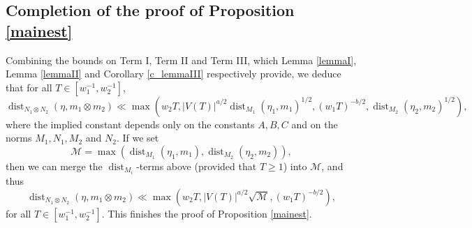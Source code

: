 \documentclass[11pt,reqno,a4paper]{amsart}
\numberwithin{equation}{section}
\DeclareMathOperator{\dist}{dist}
\theoremstyle{theorem}
\theoremstyle{definition}
\begin{document}
\subsection{Completion of the proof of Proposition \ref{mainest}}

Combining the bounds on 
Term I, Term II and Term III, which Lemma \ref{lemmaI}, Lemma \ref{lemmaII} and Corollary \ref{c_lemmaIII} 
respectively provide, we deduce that for all $T\in [w_1^{-1},w_2^{-1}]$,
\[
\dist_{N_1 \otimes N_2}(\eta,m_1 \otimes m_2)
\ll
\max(w_2 T, |V(T)|^{a/2} \dist_{M_1}(\eta_1,m_1)^{1/2},(w_1 T)^{-b/2},\dist_{M_2}(\eta_2,m_2)^{1/2}),
\]
where the implied constant depends only on the constants $A, B, C$ and on the norms $M_1,N_1,M_2$ and $N_2$. If we set
\[
\mathcal{M} = \max(\dist_{M_1}(\eta_1,m_1),\dist_{M_2}(\eta_2,m_2)),
\]
then we can merge the $\dist_{M_i}$-terms above (provided that $T \geq 1$) into $\mathcal{M}$, and thus
\[
\dist_{N_1 \otimes N_2}(\eta,m_1 \otimes m_2)
\ll
\max(w_{2} T, |V(T)|^{a/2} \sqrt{\mathcal{M}},(w_1 T)^{-b/2}),
\]
for all $T \in [w_1^{-1},w_2^{-1}]$. This finishes the proof of Proposition \ref{mainest}.
\end{document}
